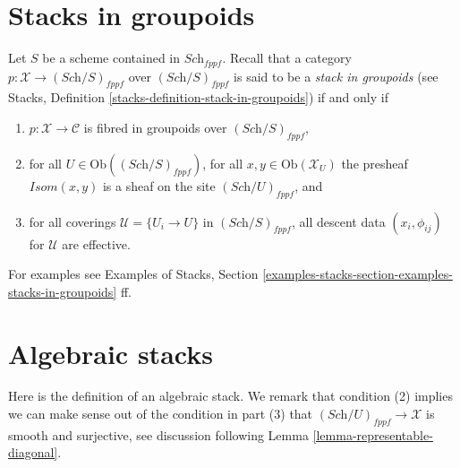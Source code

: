 \section{Stacks in groupoids}
\label{section-stacks}

\noindent
Let $S$ be a scheme contained in $\textit{Sch}_{fppf}$.
Recall that a category $p : \mathcal{X} \to (\textit{Sch}/S)_{fppf}$
over $(\textit{Sch}/S)_{fppf}$ is said to be a
{\it stack in groupoids} (see
Stacks, Definition \ref{stacks-definition-stack-in-groupoids})
if and only if
\begin{enumerate}
\item $p : \mathcal{X} \to \mathcal{C}$ is fibred
in groupoids over $(\textit{Sch}/S)_{fppf}$,
\item for all $U \in \text{Ob}((\textit{Sch}/S)_{fppf})$,
for all $x, y\in \text{Ob}(\mathcal{X}_U)$ the presheaf
$\mathit{Isom}(x, y)$ is a sheaf on the site $(\textit{Sch}/U)_{fppf}$, and
\item for all coverings $\mathcal{U} = \{U_i \to U\}$ in
$(\textit{Sch}/S)_{fppf}$, all descent data $(x_i, \phi_{ij})$
for $\mathcal{U}$ are effective.
\end{enumerate}
For examples see
Examples of Stacks,
Section \ref{examples-stacks-section-examples-stacks-in-groupoids}
ff.










\section{Algebraic stacks}
\label{section-algebraic-stacks}

\noindent
Here is the definition of an algebraic stack. We remark that condition
(2) implies we can make sense out of the condition in part (3) that
$(\textit{Sch}/U)_{fppf} \to \mathcal{X}$
is smooth and surjective, see discussion following
Lemma \ref{lemma-representable-diagonal}.

